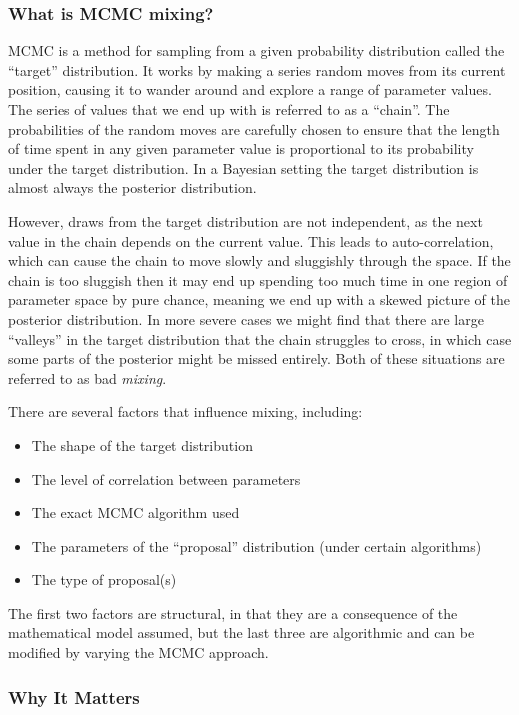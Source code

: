 \documentclass{article}
\begin{document}
\subsubsection{What is MCMC mixing?}

MCMC is a method for sampling from a given probability distribution called the “target” distribution. It works by making a series random moves from its current position, causing it to wander around and explore a range of parameter values. The series of values that we end up with is referred to as a “chain”. The probabilities of the random moves are carefully chosen to ensure that the length of time spent in any given parameter value is proportional to its probability under the target distribution. In a Bayesian setting the target distribution is almost always the posterior distribution.

However, draws from the target distribution are not independent, as the next value in the chain depends on the current value. This leads to auto-correlation, which can cause the chain to move slowly and sluggishly through the space. If the chain is too sluggish then it may end up spending too much time in one region of parameter space by pure chance, meaning we end up with a skewed picture of the posterior distribution. In more severe cases we might find that there are large “valleys” in the target distribution that the chain struggles to cross, in which case some parts of the posterior might be missed entirely. Both of these situations are referred to as bad \textit{mixing}.

There are several factors that influence mixing, including:

\begin{itemize}
    \item The shape of the target distribution
    \item The level of correlation between parameters
    \item The exact MCMC algorithm used
    \item The parameters of the “proposal” distribution (under certain algorithms)
    \item The type of proposal(s)
\end{itemize}
The first two factors are structural, in that they are a consequence of the mathematical model assumed, but the last three are algorithmic and can be modified by varying the MCMC approach.

\subsubsection{Why It Matters}
\end{document}
